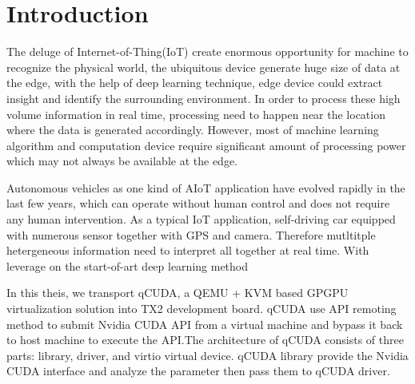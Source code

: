\chapter{Introduction}
\label{chap:intro}
The deluge of Internet-of-Thing(IoT) create enormous opportunity for machine to recognize the physical
world, the ubiquitous device generate huge size of data at the edge, with the help of deep learning
technique, edge device could extract insight and identify  the surrounding environment. In order to
process these high volume information in real time, processing need to happen near the location
where the data is generated accordingly. However, most of machine learning algorithm and computation device require
significant amount of processing power which may not always be available at the edge.

Autonomous vehicles as one kind of AIoT application have evolved rapidly in the last few
years, which can operate without human control and does
not require any human intervention. As a typical IoT application, self-driving car equipped with
numerous sensor together with GPS and camera. Therefore mutltitple hetergeneous information need to
interpret all together at real time. With leverage on the start-of-art deep learning method 


In this theis, we transport qCUDA, a QEMU + KVM based GPGPU virtualization solution into TX2
development board. qCUDA use API remoting method to submit Nvidia CUDA API from a virtual machine
and bypass it back to host machine to execute the API.The architecture of qCUDA consists of
three parts: library, driver, and virtio virtual device. qCUDA library provide the Nvidia CUDA
interface and analyze the parameter then pass them to qCUDA driver.


